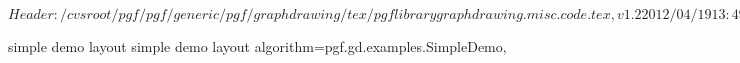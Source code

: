 %
%
%

\ProvidesFileRCS[v\pgfversion] $Header: /cvsroot/pgf/pgf/generic/pgf/graphdrawing/tex/pgflibrarygraphdrawing.misc.code.tex,v 1.2 2012/04/19 13:49:07 tantau Exp $



%
%
\pgfgddeclarealgorithmkey
  {simple demo layout}
  {simple demo layout}
  {
    algorithm=pgf.gd.examples.SimpleDemo,
  }



\endinput